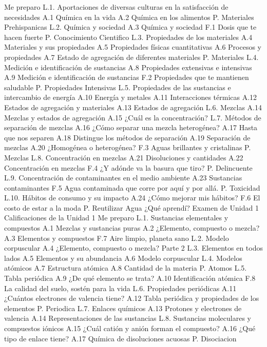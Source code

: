 Me preparo
L.1. Aportaciones de diversas culturas en la satisfacción de necesidades
A.1 Química en la vida
A.2 Química en los alimentos
P. Materiales Prehispanicas
L.2. Química y sociedad
A.3 Química y sociedad
F.1 Dosis que te hacen fuerte
P. Conocimiento Cientifico
L.3. Propiedades de los materiales
A.4 Materiales y sus propiedades
A.5 Propiedades físicas cuantitativas
A.6 Procesos y propiedades
A.7 Estado de agregación de diferentes materiales
P. Materiales
L.4. Medición e identificación de sustancias
A.8 Propiedades extensivas e intensivas
A.9 Medición e identificación de sustancias
F.2 Propiedades que te mantienen saludable
P. Propiedades Intensivas
L.5. Propiedades de las sustancias e intercambio de energía
A.10 Energía y metales
A.11 Interacciones térmicas
A.12 Estados de agregación y materiales
A.13 Estados de agregación
L.6. Mezclas
A.14 Mezclas y estados de agregación
A.15 ¿Cuál es la concentración?
L.7. Métodos de separación de mezclas
A.16 ¿Cómo separar una mezcla heterogénea?
A.17 Hasta que nos separen
A.18 Distingue los métodos de separación
A.19 Separación de mezclas
A.20 ¿Homogénea o heterogénea?
F.3 Aguas brillantes y cristalinas
P. Mezclas
L.8. Concentración en mezclas
A.21 Disoluciones y cantidades
A.22 Concentración en mezclas
F.4 ¿Y adónde va la basura que tiro?
P. Delincuente
L.9. Concentración de contaminantes en el medio ambiente
A.23 Sustancias contaminantes
F.5 Agua contaminada que corre por aquí y por allá.
P. Toxicidad
L.10. Hábitos de consumo y su impacto
A.24 ¿Cómo mejorar mis hábitos?
F.6 El costo de estar a la moda
P. Reutilizar Agua
¿Qué aprendí?
Examen de Unidad 1
Calificaciones de la Unidad 1
Me preparo
L.1. Sustancias elementales y compuestos
A.1 Mezclas y sustancias puras
A.2 ¿Elemento, compuesto o mezcla?
A.3 Elementos y compuestos
F.7 Aire limpio, planeta sano
L.2. Modelo corpuscular
A.4 ¿Elemento, compuesto o mezcla? Parte 2
L.3. Elementos en todos lados
A.5 Elementos y su abundancia
A.6 Modelo corpuscular
L.4. Modelos atómicos
A.7 Estructura atómica
A.8 Cantidad de la materia
P. Atomos
L.5. Tabla periódica
A.9 ¿De qué elemento se trata?
A.10 Identificación atómica
F.8 La calidad del suelo, sostén para la vida
L.6. Propiedades periódicas
A.11 ¿Cuántos electrones de valencia tiene?
A.12 Tabla periódica y propiedades de los elementos
P. Periodica
L.7. Enlaces químicos
A.13 Protones y electrones de valencia
A.14 Representaciones de las sustancias
L.8. Sustancias moleculares y compuestos iónicos
A.15 ¿Cuál catión y anión forman el compuesto?
A.16 ¿Qué tipo de enlace tiene?
A.17 Química de disoluciones acuosas
P. Disociacion
